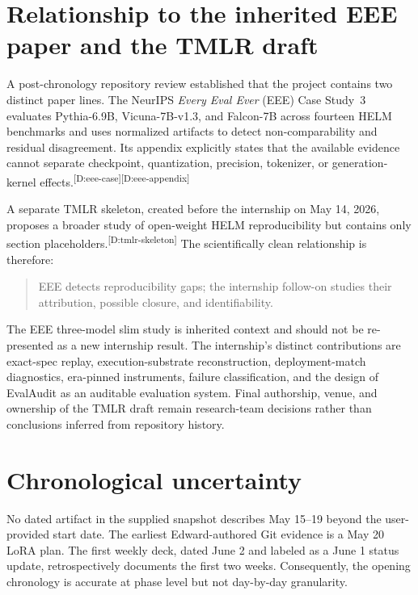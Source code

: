 \documentclass[11pt,oneside]{report}
\newcommand{\code}[1]{\texttt{\detokenize{#1}}}
\newcommand{\evmark}[1]{\allowbreak\textsuperscript{\scriptsize\textnormal{[#1]}}}
\newcommand{\docref}[1]{\evmark{D:#1}}
\begin{document}
\section{Relationship to the inherited EEE paper and the TMLR draft}

A post-chronology repository review established that the project contains two distinct paper lines. The NeurIPS \emph{Every Eval Ever} (EEE) Case Study~3 evaluates Pythia-6.9B, Vicuna-7B-v1.3, and Falcon-7B across fourteen HELM benchmarks and uses normalized artifacts to detect non-comparability and residual disagreement. Its appendix explicitly states that the available evidence cannot separate checkpoint, quantization, precision, tokenizer, or generation-kernel effects.\docref{eee-case}\docref{eee-appendix}

A separate TMLR skeleton, created before the internship on May 14, 2026, proposes a broader study of open-weight HELM reproducibility but contains only section placeholders.\docref{tmlr-skeleton} The scientifically clean relationship is therefore:

\begin{quote}
EEE detects reproducibility gaps; the internship follow-on studies their attribution, possible closure, and identifiability.
\end{quote}

The EEE three-model slim study is inherited context and should not be re-presented as a new internship result. The internship's distinct contributions are exact-spec replay, execution-substrate reconstruction, deployment-match diagnostics, era-pinned instruments, failure classification, and the design of EvalAudit as an auditable evaluation system. Final authorship, venue, and ownership of the TMLR draft remain research-team decisions rather than conclusions inferred from repository history.

\section{Chronological uncertainty}

No dated artifact in the supplied snapshot describes May 15--19 beyond the user-provided start date. The earliest Edward-authored Git evidence is a May 20 \code{infer_stack} LoRA plan. The first weekly deck, dated June 2 and labeled as a June 1 status update, retrospectively documents the first two weeks. Consequently, the opening chronology is accurate at phase level but not day-by-day granularity.
\end{document}
